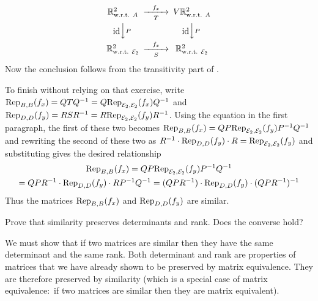 \begin{exercises}
\begin{answer}
        \begin{equation*}
          \begin{CD}
            \Re^2_\wrt{A}                   
               @>f_x>T>        
               V\Re^2_\wrt{A}       \\
            @V\scriptstyle\identity VPV                
               @V\scriptstyle\identity VPV \\
            \Re^2_\wrt{\stdbasis_2}         
               @>f_x>S>        
               \Re^2_\wrt{\stdbasis_2}
          \end{CD}
        \end{equation*}
        Now the conclusion follows from the transitivity part of
        .
        
        To finish without relying on that exercise, write
        $\rep{f_x}{B,B}=QTQ^{-1}=Q\rep{f_x}{\stdbasis_2,\stdbasis_2}Q^{-1}$
        and
        $\rep{f_y}{D,D}=RSR^{-1}=R\rep{f_y}{\stdbasis_2,\stdbasis_2}R^{-1}$.
        Using the equation in the first paragraph, 
        the first of these two becomes
        $\rep{f_x}{B,B}=QP\rep{f_y}{\stdbasis_2,\stdbasis_2}P^{-1}Q^{-1}$
        and  
        rewriting the second of these two as
        $R^{-1}\cdot\rep{f_y}{D,D}\cdot R=\rep{f_y}{\stdbasis_2,\stdbasis_2}$
        and substituting gives the desired relationship
        \begin{multline*}
          \rep{f_x}{B,B}
          =QP\rep{f_y}{\stdbasis_2,\stdbasis_2}P^{-1}Q^{-1}  \\
          =QPR^{-1}\cdot\rep{f_y}{D,D}\cdot RP^{-1}Q^{-1}
          =(QPR^{-1})\cdot\rep{f_y}{D,D}\cdot (QPR^{-1})^{-1}
        \end{multline*}
        Thus the matrices \( \rep{f_x}{B,B}  \) and \( \rep{f_y}{D,D} \) are
        similar. 
      \end{answer}
  \item 
     Prove that similarity preserves determinants and rank.
     Does the converse hold?
     \begin{answer}
       We must show that if two matrices are similar then they have the same
       determinant and the same rank.
       Both determinant and rank are properties of matrices that we 
       have already shown to be preserved by matrix equivalence. 
       They are therefore preserved by similarity (which is a 
       special case of matrix equivalence:~if two matrices
       are similar then they are matrix equivalent).


\end{answer}
\end{exercises}
